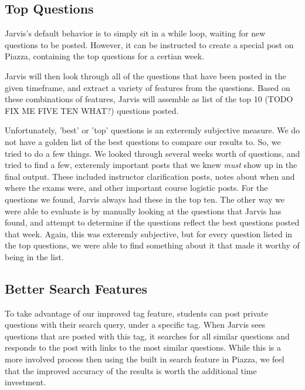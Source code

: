 \documentclass[sigconf]{acmart}
\begin{document}
\subsection{Top Questions}
Jarvis's default behavior is to simply sit in a while loop, waiting for new questions to be posted. However, it can be instructed to create a special post on Piazza, containing the top questions for a certian week.

Jarvis will then look through all of the questions that have been posted in the given timeframe, and extract a variety of features from the questions. Based on these combinations of features, Jarvis will assemble as list of the top 10 (TODO FIX ME FIVE TEN WHAT?) questions posted. 

Unfortunately, 'best' or 'top' questions is an exteremly subjective measure. We do not have a golden list of the best questions to compare our results to. So, we tried to do a few things. We looked through several weeks worth of questions, and tried to find a few, exteremly important posts that we knew \textit{must} show up in the final output. These included instructor clarification posts, notes about when and where the exams were, and other important course logistic posts. For the questions we found, Jarvis always had these in the top ten. The other way we were able to evaluate is by manually looking at the questions that Jarvis has found, and attempt to determine if the questions reflect the best questions posted that week. Again, this was exteremly subjective, but for every question listed in the top questions, we were able to find something about it that made it worthy of being in the list.

\subsection{Better Search Features}
To take advantage of our improved tag feature, students can post private questions with their search query, under a specific tag. When Jarvis sees questions that are posted with this tag, it searches for all similar questions and responds to the post with links to the most similar questions. While this is a more involved process then using the built in search feature in Piazza, we feel that the improved accuracy of the results is worth the additional time investment.
\end{document}
